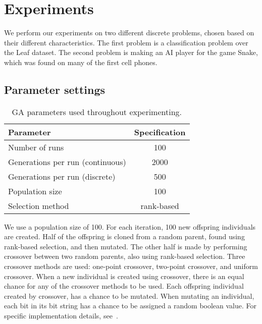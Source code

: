 \section{Experiments}

We perform our experiments on two different discrete problems, chosen based on their different characteristics.
The first problem is a classification problem over the Leaf dataset.
The second problem is making an AI player for the game Snake, which was found on many of the first cell phones.

\subsection{Parameter settings}

\begin{table}
  \centering
  \begin{tabular}{l S}
    \toprule
    Parameter & {Specification} \\
    \midrule
    Number of runs & 100 \\
    Generations per run (continuous) & 2000 \\
    Generations per run (discrete) & 500 \\
    Population size & 100 \\
    Selection method & {rank-based} \\
    \bottomrule
  \end{tabular}
  \caption{GA parameters used throughout experimenting.}
  \label{tab:gaparam}
\end{table}

We use a population size of 100. For each iteration, 100 new offspring individuals are created. Half of the offspring is cloned from a random parent, found using rank-based selection, and then mutated. The other half is made by performing crossover between two random parents, also using rank-based selection.
Three crossover methods are used: one-point crossover, two-point crossover, and uniform crossover. When a new individual is created using crossover, there is an equal chance for any of the crossover methods to be used. 
Each offspring individual created by crossover, has a  chance to be mutated.
When mutating an individual, each bit in its bit string has a  chance to be assigned a random boolean value.
For specific implementation details, see~\cite{mbm:kmc:ekoGA}.




